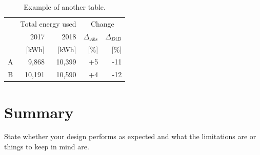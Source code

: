 \begin{table}
         \centering
        \footnotesize
        \caption{Example of another table.}

         \begin{tabular}{c@{\qquad}rrrr}
          \toprule
          \multirow{2}{*}{\raisebox{-\heavyrulewidth}{Schools }} & \multicolumn{2}{c}{Total energy used}& \multicolumn{2}{c}{Change}\\
          \cmidrule{2-5}
            & 2017 & 2018 & $\Delta_{Abs}$ & $\Delta_{DiD}$\\
            & [kWh] & [kWh] & [\%] & [\%] \\
          \midrule
          A & 9,868      & 10,399 & +5 & -11\\
          B & 10,191     & 10,590 & +4 & -12\\
          \bottomrule
        \end{tabular}
     \label{tab:table2}
\end{table}


\section{Summary}\label{sec:temp_summary}
State whether your design performs as expected and what the limitations are or things to keep in mind are. 


